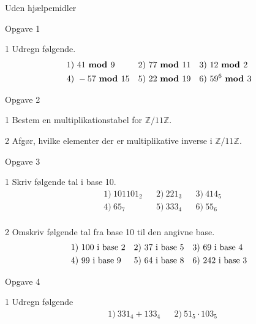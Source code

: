 \documentclass[12pt,x11names,a4paper]{article}
\begin{document}
\begin{center}
	\Large
	Uden hjælpemidler	
\end{center}
%
%
%
%
%
\begin{opgavetekst}{Opgave 1}
\end{opgavetekst}
%
%
\begin{delopgave}{1}
	Udregn følgende.
	\begin{align*}
		&1) \ 41 \ \textbf{mod }{9}   &&2) \ 77 \ \textbf{mod }{11}   &&3) \ 12 \ \textbf{mod }{2}   \\
		&4) \ -57 \ \textbf{mod }{15}   &&5) \ 22 \ \textbf{mod }{19}   &&6) \ 59^{6} \ \textbf{mod }{3}   \\
	\end{align*}
\end{delopgave}
%
%
%
%
%
\begin{opgavetekst}{Opgave 2}
\end{opgavetekst}
%
%
\begin{delopgave}{1}
	Bestem en multiplikationstabel for $\mathbb{Z}/11\mathbb{Z}$. 
\end{delopgave}
%
%
\begin{delopgave}{2}
	Afgør, hvilke elementer der er multiplikative inverse i $\mathbb{Z}/11\mathbb{Z}$. 
\end{delopgave}
%
%
%
%
%
\begin{opgavetekst}{Opgave 3}
\end{opgavetekst}
\begin{delopgave}{1}
	Skriv følgende tal i base 10.
	\begin{align*}
		&1) \ 101101_2   &&2) \ 221_3   &&3) \ 414_5    \\
		&4) \ 65_7   &&5) \ 333_4    &&6) \ 55_6   \\
	\end{align*}
\end{delopgave}
\begin{delopgave}{2}
	Omskriv følgende tal fra base 10 til den angivne base.
	\begin{align*}
		&1) \ 100\textnormal{ i base 2}   &&2) \ 37\textnormal{ i base 5}   &&3) \ 69\textnormal{ i base 4}    \\
		&4) \ 99\textnormal{ i base 9}   &&5) \ 64\textnormal{ i base 8}    &&6) \ 242\textnormal{ i base 3}   \\
	\end{align*}	 
\end{delopgave}
%
%
%
%
%
\begin{opgavetekst}{Opgave 4}
\end{opgavetekst}
\begin{delopgave}{1}
	Udregn følgende
	\begin{align*}
		&1) \ 331_4 + 133_4 &&2) \ 51_5\cdot 103_5
	\end{align*}
\end{delopgave}
\end{document}
